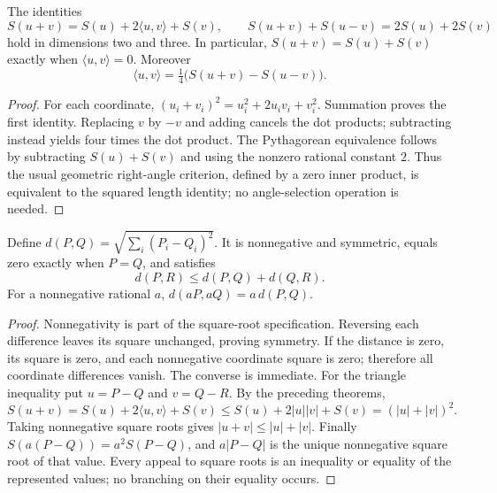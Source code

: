 \begin{theorem}
\label{geo:pythagoras}
The identities
\[
 S(u+v)=S(u)+2\langle u,v\rangle+S(v),\qquad
 S(u+v)+S(u-v)=2S(u)+2S(v)
\]
hold in dimensions two and three. In particular,
$S(u+v)=S(u)+S(v)$ exactly when $\langle u,v\rangle=0$.
Moreover
\[
 \langle u,v\rangle=\tfrac14\bigl(S(u+v)-S(u-v)\bigr).
\]
\end{theorem}
\begin{proof}
For each coordinate,
$(u_i+v_i)^2=u_i^2+2u_iv_i+v_i^2$.
Summation proves the first identity. Replacing $v$ by $-v$ and adding cancels
the dot products; subtracting instead yields four times the dot product.
The Pythagorean equivalence follows by subtracting $S(u)+S(v)$ and using
the nonzero rational constant $2$. Thus the usual geometric right-angle
criterion, defined by a zero inner product, is equivalent to the squared
length identity; no angle-selection operation is needed.
\end{proof}

\begin{theorem}
\label{geo:metric}
Define $d(P,Q)=\sqrt{\sum_i(P_i-Q_i)^2}$. It is nonnegative and symmetric,
equals zero exactly when $P=Q$, and satisfies
\[
 d(P,R)\le d(P,Q)+d(Q,R).
\]
For a nonnegative rational $a$, $d(aP,aQ)=a\,d(P,Q)$.
\end{theorem}
\begin{proof}
Nonnegativity is part of the square-root specification. Reversing each
difference leaves its square unchanged, proving symmetry. If the distance
is zero, its square is zero, and each nonnegative coordinate square is zero;
therefore all coordinate differences vanish. The converse is immediate.
For the triangle inequality put $u=P-Q$ and $v=Q-R$. By the preceding
theorems,
\[
 S(u+v)=S(u)+2\langle u,v\rangle+S(v)
 \le S(u)+2|u||v|+S(v)=(|u|+|v|)^2.
\]
Taking nonnegative square roots gives $|u+v|\le|u|+|v|$.
Finally $S(a(P-Q))=a^2S(P-Q)$, and $a|P-Q|$ is the unique nonnegative
square root of that value. Every appeal to square roots is an inequality
or equality of the represented values; no branching on their equality occurs.
\end{proof}

